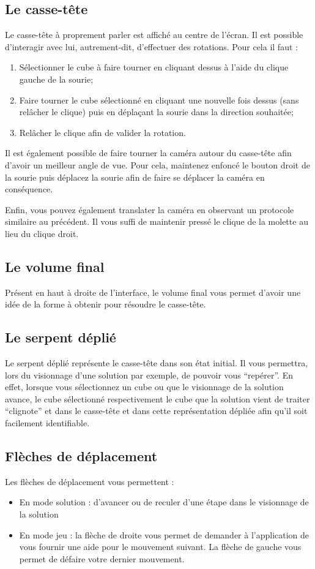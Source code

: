 \documentclass[a4paper,10pt]{article}
\begin{document}
\subsection{Le casse-tête}
Le casse-tête à proprement parler est affiché au centre de l'écran. Il est possible d'interagir avec lui, autrement-dit, d'effectuer des rotations. Pour cela il faut :
\begin{enumerate}
 \item Sélectionner le cube à faire tourner en cliquant dessus à l'aide du clique gauche de la sourie;
 \item Faire tourner le cube sélectionné en cliquant une nouvelle fois dessus (sans relâcher le clique) puis en déplaçant la sourie dans la direction souhaitée;
 \item Relâcher le clique afin de valider la rotation.
\end{enumerate}

Il est également possible de faire tourner la caméra autour du casse-tête afin d'avoir un meilleur angle de vue. Pour cela, maintenez enfoncé le bouton droit de la sourie puis déplacez la sourie afin de faire se déplacer la caméra en conséquence.

Enfin, vous pouvez également translater la caméra en observant un protocole similaire au précédent. Il vous suffi de maintenir pressé le clique de la molette au lieu du clique droit.

\subsection{Le volume final}
Présent en haut à droite de l'interface, le volume final vous permet d'avoir une idée de la forme à obtenir pour résoudre le casse-tête.

\subsection{Le serpent déplié}
Le serpent déplié représente le casse-tête dans son état initial. Il vous permettra, lors du visionnage d'une solution par exemple, de pouvoir vous ``repérer''. En effet, lorsque vous sélectionnez un cube ou que le visionnage de la solution avance, le cube sélectionné respectivement le cube que la solution vient de traiter ``clignote'' et dans le casse-tête et dans cette représentation dépliée afin qu'il soit facilement identifiable.

\subsection{Flèches de déplacement}
Les flèches de déplacement vous permettent :
\begin{itemize}
 \item En mode solution : d'avancer ou de reculer d'une étape dans le visionnage de la solution
 \item En mode jeu : la flèche de droite vous permet de demander à l'application de vous fournir une aide pour le mouvement suivant. La flèche de gauche vous permet de défaire votre dernier mouvement.
\end{itemize}
\end{document}

